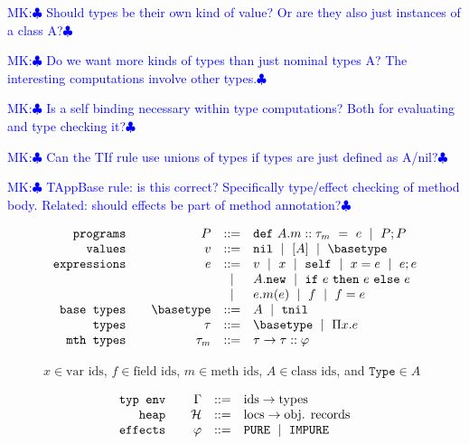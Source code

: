 \documentclass{article}
\def\spmid{\ \mid \ }
\def\MK#1{\textcolor{blue}{\sf MK:$\clubsuit$ #1$\clubsuit$}}
\newcommand{\pure}{\texttt{PURE}}
\newcommand{\impure}{\texttt{IMPURE}}
\newcommand\val{\ensuremath{v}\xspace}
\newcommand\expr{\ensuremath{e}\xspace}
\newcommand\prog{\ensuremath{P}\xspace}
\newcommand\type{\tau}
\newcommand\deptype{\ensuremath{\Pi\var.\expr}}
\newcommand\methtype{\type_m}
\newcommand\pdef[3]{\ensuremath{\texttt{def}\ #1::#2\ =\ #3}\xspace}
\newcommand\var{\ensuremath{x}\xspace}
\newcommand\tnil{\texttt{tnil}\xspace}
\newcommand\vnil{\texttt{nil}\xspace}
\newcommand\vinst[1]{\ensuremath{[#1]}\xspace}
\newcommand\eseq[2]{\ensuremath{#1 ; #2}\xspace}
\newcommand\eassn[2]{\ensuremath{#1 = #2}\xspace}
\newcommand\eif[3]{\ensuremath{\texttt{if}\ #1\ \texttt{then}\ #2\ \texttt{else}\ #3}\xspace}
\newcommand\eself{\texttt{self}\xspace}
\newcommand\emethcall[3]{\ensuremath{#1.#2(#3)}\xspace}
\newcommand\efield{\ensuremath{f}\xspace}
\newcommand\efieldassn[1]{\ensuremath{\efield = #1}\xspace}
\newcommand\enew[1]{\ensuremath{#1 . \texttt{new}}\xspace}
\newcommand\mthtype[3]{\ensuremath{#1 \rightarrow #2 :: #3}\xspace}
\begin{document}
\MK{Should types be their own kind of value? Or are they also just instances of a class A?}

\MK{Do we want more kinds of types than just nominal types A? The interesting computations involve other types.}

\MK{Is a self binding necessary within type computations? Both for evaluating and type checking it?}

\MK{Can the TIf rule use unions of types if types are just defined as A/nil?}

\MK{TAppBase rule: is this correct? Specifically type/effect checking of method body. Related: should effects be part of method annotation?}
\begin{figure}[t!]
\centering
$$
\begin{array}{rrcl}

\texttt{programs} \quad
& \prog
& ::= & \pdef{A.m}{\methtype}{\expr} \spmid \prog ; \prog
\\

\texttt{values} \quad
& \val
& ::= & \vnil \spmid \vinst{A} \spmid \basetype
\\%

\texttt{expressions} \quad
& \expr
& ::= & \val \spmid \var \spmid \eself \spmid \eassn{\var}{\expr} \spmid \eseq{\expr}{\expr} \\
&     & \spmid & \enew{A} \spmid \eif{\expr}{\expr}{\expr}\\ 
&     & \spmid & \emethcall{e}{m}{e} \spmid \efield \spmid \efieldassn{\expr}
\\

\texttt{base types} \quad
& \basetype
& ::= & A \spmid \tnil\\

\texttt{types} \quad
& \type
& ::= & \basetype \spmid  \deptype \\%

\texttt{mth types} \quad
& \methtype
& ::= & \mthtype{\tau}{\tau}{\varphi}
\end{array}
$$

  $x\in\textrm{var ids}$, $\efield\in\textrm{field ids}$, $m\in\textrm{meth ids}$, $A\in\textrm{class ids}$, and $\texttt{Type}\in A$
  
$$  
\begin{array}{rrcl}
\texttt{typ env} \quad
& \Gamma
& ::= & \textnormal{ids}\rightarrow \textnormal{types}
\\
\texttt{heap} \quad
& \mathcal{H}
& ::= & \textnormal{locs}\rightarrow\textnormal{obj. records}
\\
\texttt{effects}\quad
& \varphi
& ::= & \pure \spmid \impure
\end{array}
$$
\end{figure}
\end{document}
